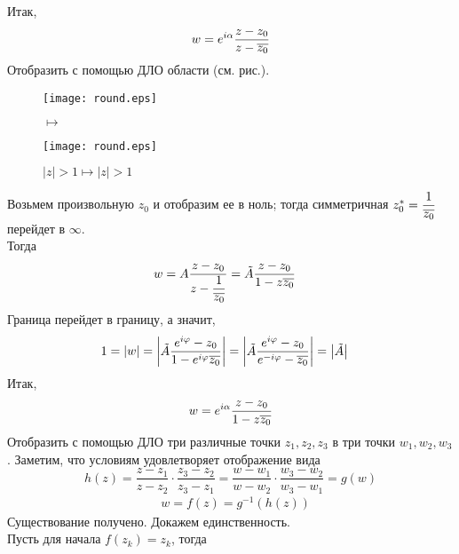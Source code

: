Итак,
\begin{equation}\label{(23.6)}
    w = e^{i \alpha}\frac{z-z_0}{z-\overline{z_0}}
\end{equation}
\Example
Отобразить с помощью ДЛО области (см. рис.).
\\
\begin{figure}[h!]
    \begin{minipage}[c]{0.45\textwidth}
        \centering
        \texttt{[image: round.eps]}
    \end{minipage}
    \begin{minipage}[c]{0.1\textwidth}
        \centering
        \LARGE{$\mapsto$}
    \end{minipage}
    \begin{minipage}[c]{0.45\textwidth}
        \centering
        \texttt{[image: round.eps]}
    \end{minipage}
    \label{fig:23.3}
    \caption{$\left| z \right| > 1 \mapsto \left| z \right| > 1$}
\end{figure}
\nonum
Возьмем произвольную $z_0$ и отобразим ее в ноль; тогда симметричная $z_0^* =
\displaystyle \frac{1}{\overline{z_0}}$ перейдет в $\infty$.
\\
Тогда
\begin{align*}
    & w = A\frac{z-z_0}{z-\displaystyle \frac{1}{\overline{z_0}}} = \tilde{A}\frac{z-z_0}{1 - z\overline{z_0}}
\end{align*}
Граница перейдет в границу, а значит,
\begin{align*}
    & 1 = \left|{w}\right| = \left|{\tilde{A}\frac{e^{i \varphi}-z_0}{1 - e^{i \varphi}\overline{z_0}}}\right| = \left|{\tilde{A}\frac{e^{i \varphi}-z_0}{e^{-i \varphi}-\overline{z_0}}}\right| = \left|{\tilde{A}}\right|
\end{align*}
Итак,
\begin{equation}\label{(23.7)}
    w = e^{i \alpha}\frac{z-z_0}{1 - z\overline{z_0}}
\end{equation}
\Example
Отобразить с помощью ДЛО три различные точки $z_1, z_2, z_3$ в три точки $w_1,
w_2,w_3$.
\nonum
Заметим, что условиям удовлетворяет отображение вида
\begin{equation}\label{(23.8)}
    h(z) = \frac{z-z_1}{z-z_2} \cdot \frac{z_3-z_2}{z_3-z_1} = \frac{w-w_1}{w-w_2} \cdot \frac{w_3-w_2}{w_3-w_1} = g(w)
\end{equation}
\begin{align*}
  & w = f(z) = g^{-1}(h(z))
\end{align*}
Существование получено. Докажем единственность.
\\
Пусть для начала $f(z_k) = z_k$, тогда
